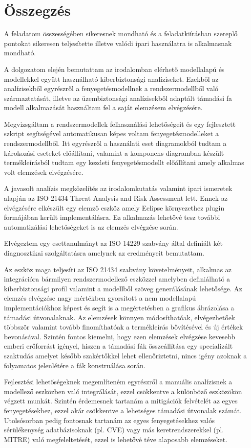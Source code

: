 \chapter{Összegzés}

A feladatom összességében sikeresnek mondható és a feladatkiírásban szereplő pontokat sikeresen teljesítette illetve valódi ipari használatra is alkalmasnak mondható.

A dolgozatom elején bemutattam az irodalomban elérhető modellalapú és modellekkel együtt használható kiberbiztonsági analíziseket. Ezekből az analízisekből egyrészről a fenyegetésmodellnek a rendszermodellből való származtatását, illetve az üzembiztonsági analízisekből adaptált támadási fa modell alkalmazását használtam fel a saját elemzésem elvégzésére. 

Megvizsgáltam a rendszermodellek felhasználási lehetőségeit és egy fejlesztett szkript segítségével automatikusan képes voltam fenyegetésmodelleket a rendszermodellből. Itt egyrészről a használati eset diagramokból tudtam a károkozási eseteket előállítani, valamint a komponens diagramban készült termékleírásból tudtam egy kezdeti fenyegetésmodellt előállítani amely alkalmas volt elemzések elvégzésére.

A javasolt analízis megközelítés az irodalomkutatás valamint ipari ismeretek alapján az ISO 21434 \cite{ISO21434} Threat Analysis and Risk Assessment lett. Ennek az elvégzésére elkészült egy elemző eszköz amely Eclipse környezethez plugin formájában került implementálásra. Ez alkalmazás lehetővé tesz további automatizálási lehetőségeket is az elemzés elvégzése során.

Elvégeztem egy esettanulmányt az ISO 14229 \cite{ISO14229} szabvány által definiált két diagnosztikai szolgáltatásra amelynek az eredményeit bemutattam.

Az eszköz maga teljesíti az ISO 21434 szabvány követelményeit, alkalmas az integrációra bármilyen rendszermodellező eszközzel amelyben definiálható a kiberbiztonsági profil valamint a modellből szöveg generálásának lehetősége. Az elemzés elvégzése nagy mértékben gyorsított a nem modellalapú implementációkhoz képest és segít is a megértetésben a grafikus ábrázolása a támadási útvonalaknak. Az elemzések könnyen módosíthatóak, elvégezhetőek többször valamint tovább finomíthatóak a termékleírás bővítésével és új értékek bevonásával. Szintén fontos kiemelni, hogy ezen elemzések elvégzése kevesebb emberi erőforrást igényel, hiszen a támadási fák összeállítása egy specializált szaktudás amelyet később szakértőkkel lehet ellenőriztetni, nincs igény azoknak a folyamatos jelenlétére a fák konstruálása során.

Fejlesztési lehetőségeknek megemlíteném egyrészről a manuális analízisnek a modellező eszközben való integrálását, ezzel csökkentve a különböző eszközökön végzett munkát. Szintén érdemesnek tartanám a mitigációk felvételét az egyes fenyegetésekhez, ezzel akár csökkentve a lehetséges támadási útvonalak számát. Utolsósorban pedig fontosnak tartanám az egyes fenyegetésekhez valós sérülékenység adatbázisoknak (pl. CVE) vagy más keretrendszerekkel (pl. MITRE) való megfeleltetését, ezzel is lehetővé téve alaposabb elemzéseket.